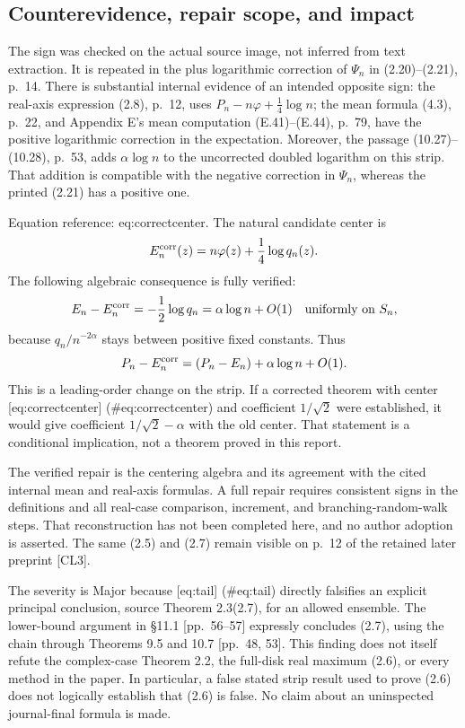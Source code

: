 \documentclass[10pt]{article}
\begin{document}
\subsection*{Counterevidence, repair scope, and impact}
The sign was checked on the actual source image, not inferred from text extraction. It is repeated in the plus logarithmic correction of \(\Psi_n\) in (2.20)–(2.21), p. 14. There is substantial internal evidence of an intended opposite sign: the real-axis expression (2.8), p. 12, uses \(P_n-n\varphi+\frac14\log n\); the mean formula (4.3), p. 22, and Appendix E’s mean computation (E.41)–(E.44), p. 79, have the positive logarithmic correction in the expectation. Moreover, the passage (10.27)–(10.28), p. 53, adds \(\alpha\log n\) to the uncorrected doubled logarithm on this strip. That addition is compatible with the negative correction in \(\Psi_n\), whereas the printed (2.21) has a positive one.\par
Equation reference: eq:correctcenter. The natural candidate center is \[
 E_n^{\rm corr}(z)=n\varphi(z)+\frac14\log q_n(z).\] The following algebraic consequence is fully verified: \[E_n-E_n^{\rm corr}=-\frac12\log q_n
                   =\alpha\log n+O(1)
       \quad\hbox{uniformly on }S_n,\] because \(q_n/n^{-2\alpha}\) stays between positive fixed constants. Thus \[P_n-E_n^{\rm corr}
       =(P_n-E_n)+\alpha\log n+O(1).\] This is a leading-order change on the strip. If a corrected theorem with center [eq:correctcenter] (\#eq:correctcenter) and coefficient \(1/\sqrt2\) were established, it would give coefficient \(1/\sqrt2-\alpha\) with the old center. That statement is a conditional implication, not a theorem proved in this report.\par
The verified repair is the centering algebra and its agreement with the cited internal mean and real-axis formulas. A full repair requires consistent signs in the definitions and all real-case comparison, increment, and branching-random-walk steps. That reconstruction has not been completed here, and no author adoption is asserted. The same (2.5) and (2.7) remain visible on p. 12 of the retained later preprint [CL3].\par
The severity is Major because [eq:tail] (\#eq:tail) directly falsifies an explicit principal conclusion, source Theorem 2.3(2.7), for an allowed ensemble. The lower-bound argument in §11.1 [pp. 56–57] expressly concludes (2.7), using the chain through Theorems 9.5 and 10.7 [pp. 48, 53]. This finding does not itself refute the complex-case Theorem 2.2, the full-disk real maximum (2.6), or every method in the paper. In particular, a false stated strip result used to prove (2.6) does not logically establish that (2.6) is false. No claim about an uninspected journal-final formula is made.\par
\end{document}
